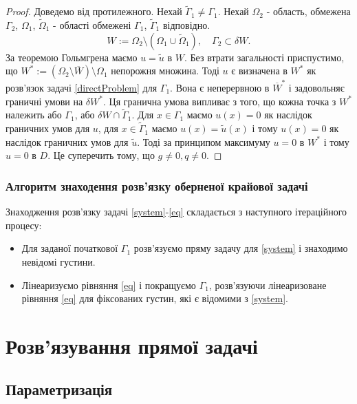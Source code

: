 \documentclass[12pt]{report}
\begin{document}
\begin{proof}

Доведемо від протилежного. Нехай $\tilde{\Gamma}_1\neq\Gamma_1$.
Нехай $\Omega_2$ - область, обмежена $\Gamma_2$, $\Omega_1$, $\tilde{\Omega}_1$ - області обмежені $\Gamma_1$, $\tilde{\Gamma}_1$ відповідно. 
\begin{equation}
W:=\Omega_2\setminus(\Omega_1\cup\tilde{\Omega}_1), \quad \Gamma_2\subset\delta W. \nonumber
\end{equation}
За теоремою Гольмгрена маємо $u = \tilde{u}$ в $W$. Без втрати загальності приспустимо, що $W^{*}:=(\Omega_2\setminus \overline{W})\setminus\Omega_1$ непорожня множина. Тоді $u$ є визначена в $W^{*}$ як розв'язок задачі \eqref{directProblem} для $\Gamma_1$. Вона є неперервною в $\overline{W}^{*}$ і задовольняє граничні умови на $\delta W^{*}$. Ця гранична умова випливає з того, що кожна точка з $W^{*}$ належить або $\Gamma_1$, або $\delta W\cap\tilde{\Gamma}_1$. Для $x\in\Gamma_1$ маємо $u(x)=0$ як наслідок граничних умов для $u$, для $x\in\tilde{\Gamma}_1$ маємо $u(x)=\tilde{u}(x)$ і тому $u(x)=0$ як наслідок граничних умов для $\tilde{u}$. Тоді за принципом максимуму $u=0$ в $W^{*}$ і тому $u=0$ в $D$. Це суперечить тому, що $g\neq 0, q\neq 0$.
\end{proof}

\subsection{Алгоритм знаходення розв'язку оберненої крайової задачі}

Знаходження розв'язку задачі \eqref{system}-\eqref{eq} складається з наступного ітераційного процесу:
\begin{itemize}
  \item Для заданої початкової $\Gamma_1$ розв'язуємо пряму задачу для \eqref{system} і знаходимо невідомі густини.
  \item Лінеаризуємо рівняння \eqref{eq} і покращуємо $\Gamma_1$, розв'язуючи лінеаризоване рівняння \eqref{eq} для фіксованих густин, які є відомими з \eqref{system}.
\end{itemize}


\chapter{Розв'язування прямої задачі}

\section{Параметризація}
\end{document}
